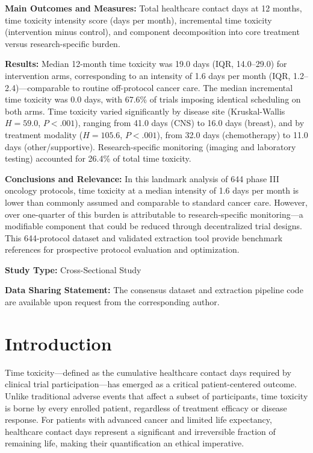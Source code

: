 \documentclass[12pt]{article}
\begin{document}
\noindent\textbf{Main Outcomes and Measures:}
Total healthcare contact days at 12 months, time toxicity intensity score (days per month), incremental time toxicity (intervention minus control), and component decomposition into core treatment versus research-specific burden.

\noindent\textbf{Results:}
Median 12-month time toxicity was 19.0 days (IQR, 14.0--29.0) for intervention arms, corresponding to an intensity of 1.6 days per month (IQR, 1.2--2.4)---comparable to routine off-protocol cancer care. The median incremental time toxicity was 0.0 days, with 67.6\% of trials imposing identical scheduling on both arms. Time toxicity varied significantly by disease site (Kruskal-Wallis $H = 59.0$, $P < .001$), ranging from 41.0 days (CNS) to 16.0 days (breast), and by treatment modality ($H = 105.6$, $P < .001$), from 32.0 days (chemotherapy) to 11.0 days (other/supportive). Research-specific monitoring (imaging and laboratory testing) accounted for 26.4\% of total time toxicity.

\noindent\textbf{Conclusions and Relevance:}
In this landmark analysis of 644 phase III oncology protocols, time toxicity at a median intensity of 1.6 days per month is lower than commonly assumed and comparable to standard cancer care. However, over one-quarter of this burden is attributable to research-specific monitoring---a modifiable component that could be reduced through decentralized trial designs. This 644-protocol dataset and validated extraction tool provide benchmark references for prospective protocol evaluation and optimization.

\vspace{6pt}
\noindent\textbf{Study Type:} Cross-Sectional Study

\vspace{6pt}
\noindent\textbf{Data Sharing Statement:} The consensus dataset and extraction pipeline code are available upon request from the corresponding author.

\section*{Introduction}

Time toxicity---defined as the cumulative healthcare contact days required by clinical trial participation---has emerged as a critical patient-centered outcome.\cite{gupta2022,shah2024} Unlike traditional adverse events that affect a subset of participants, time toxicity is borne by every enrolled patient, regardless of treatment efficacy or disease response. For patients with advanced cancer and limited life expectancy, healthcare contact days represent a significant and irreversible fraction of remaining life, making their quantification an ethical imperative.
\end{document}
